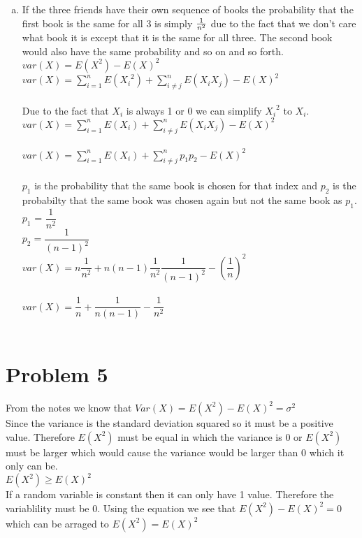 \documentclass[11pt,letterpaper]{article}
\begin{document}
\begin{enumerate}[(a)]
\clearpage
\item
If the three friends have their own sequence of books the probability that the first book is the same for all 3 is simply $1 \over n^2$ due to the fact that we don't care what book it is except that it is the same for all three. The second book would also have the same probability and so on and so forth.\\
$var(X) = E(X^2) -E(X)^2$\\
$var(X) = \sum\limits_{i=1}^nE({X_i}^2)  + \sum\limits_{i \neq j}^nE({X_iX_j})-E(X)^2$\\\\
Due to the fact that $X_i$ is always 1 or 0 we can simplify ${X_i}^2$ to $X_i$.\\
$var(X) = \sum\limits_{i=1}^nE({X_i})  + \sum\limits_{i \neq j}^nE({X_iX_j})-E(X)^2$\\\\
$var(X) = \sum\limits_{i=1}^nE({X_i})  + \sum\limits_{i \neq j}^np_1p_2-E(X)^2$\\\\
$p_1$ is the probability that the same book is chosen for that index and $p_2$ is the probabilty that the same book was chosen again but not the same book as $p_1$.\\
$p_1$ = $\dfrac{1}{n^2}$\\
$p_2 = \dfrac{1}{(n-1)^2}$\\
$var(X) = n\dfrac{1}{n^2}  + n(n-1)\dfrac{1}{n^2}\dfrac{1}{(n-1)^2}-(\dfrac{1}{n})^2$\\\\
$var(X) = \dfrac{1}{n}  + \dfrac{1}{n(n-1)}-\dfrac{1}{n^2}$\\\\
\end{enumerate}
\clearpage
\section*{Problem 5}
From the notes we know that
$Var(X) = E(X^2)- E(X)^2 = \sigma^2$\\
Since the variance is the standard deviation squared so it must be a positive value.
Therefore $E(X^2)$ must be equal in which the variance is 0 or $E(X^2)$ must be larger which would cause the variance would be larger than 0 which it only can be.\\
$E(X^2) \geq E(X)^2$ \\
If a random variable is constant then it can only have 1 value. Therefore the variablility must be 0. Using the equation we see that $E(X^2)- E(X)^2 = 0$ which can be arraged to $E(X^2) = E(X)^2$
\clearpage
\end{document}

